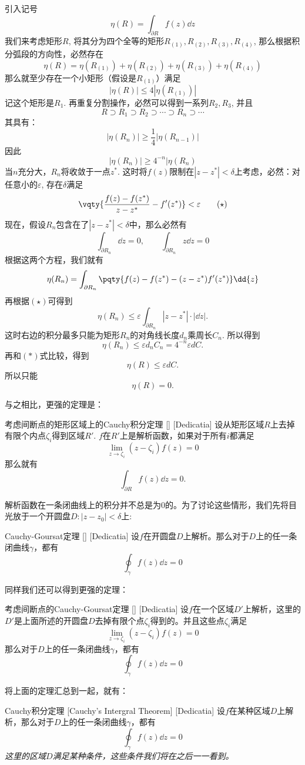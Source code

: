 \documentclass[UTF8]{ctexart}
\begin{document}
\begin{prf}
    引入记号
    \[\eta(R)=\int_{\partial R}f(z)\dd{z}\]
    我们来考虑矩形$R$, 将其分为四个全等的矩形$R_{(1)}, R_{(2)}, R_{(3)}, R_{(4)}$, 那么根据积分弧段的方向性，必然存在
    \[\eta(R)=\eta(R_{(1)})+\eta(R_{(2)})+\eta(R_{(3)})+\eta(R_{(4)})\]
    那么就至少存在一个小矩形（假设是$R_{(1)}$）满足
    \[|\eta(R)|\leqslant 4|\eta(R_{(1)})|\]
    记这个矩形是$R_1$. 再重复分割操作，必然可以得到一系列$R_2, R_3$, 并且
    \[R\supset R_1\supset R_2\supset\cdots\supset R_n\supset\cdots\]
    其具有：
    \[|\eta(R_n)|\geqslant \frac{1}{4}|\eta(R_{n-1})|\]
    因此
    \[|\eta(R_n)|\geqslant 4^{-n}|\eta(R_n)\tag{$\ast$}\]
    当$n$充分大，$R_n$将收敛于一点$z^*$. 这时将$f(z)$限制在$|z-z^*|<\delta $上考虑，必然：对任意小的$\varepsilon$, 存在$\delta$满足
    \[\vqty{\frac{f(z)-f(z^*)}{z-z^*}-f'(z^*)}<\varepsilon\tag{$\star$}\]
    现在，假设$R_n$包含在了$|z-z^*|<\delta$中，那么必然有
    \[\int_{\partial R_n}\dd{z}=0,\qquad\int_{\partial R_n}z\dd{z}=0\]
    根据这两个方程，我们就有
    \[\eta(R_n)=\int_{\partial R_n}\pqty{f(z)-f(z^*)-(z-z^*)f'(z^*)}\dd{z}\]
    再根据$(\star)$可得到
    \[\eta(R_n)\leqslant\varepsilon\int_{\partial R_n}|z-z^*|\cdot|\dd z|. \]
    这时右边的积分最多只能为矩形$R_n$的对角线长度$d_n$乘周长$C_n$. 所以得到
    \[\eta(R_n)\leqslant\varepsilon d_nC_n=4^{-n}\varepsilon dC.\]
    再和$(\ast)$式比较，得到
    \[\eta(R)\leqslant\varepsilon dC.\]
    所以只能
    \[\eta(R)=0.\]
\end{prf}
与之相比，更强的定理是：
\begin{thm}
    [UUID]
    {考虑间断点的矩形区域上的Cauchy积分定理}
    []
    [Dedicatia]
    设从矩形区域$R$上去掉有限个内点$\zeta_i$得到区域$R'$. $f$在$R'$上是解析函数，如果对于所有$i$都满足
    \[\lim_{z\to\zeta_i }(z-\zeta_i)f(z)=0\]
    那么就有
    \[\int_{\partial R}f(z)\dd{z}=0.\]
\end{thm}
解析函数在一条闭曲线上的积分并不总是为0的。为了讨论这些情形，我们先将目光放于一个开圆盘$D: |z-z_0|<\delta $上:
\begin{thm}
    [UUID]
    {Cauchy-Goursat定理}
    []
    [Dedicatia]
    设$f$在开圆盘$D$上解析。那么对于$D$上的任一条闭曲线$\gamma$，都有
    \[\oint_\gamma f(z)\dd{z}=0\]
\end{thm}
同样我们还可以得到更强的定理：
\begin{thm}
    [UUID]
    {考虑间断点的Cauchy-Goursat定理}
    []
    [Dedicatia]
    设$f$在一个区域$D'$上解析，这里的$D'$是上面所述的开圆盘$D$去掉有限个点$\zeta_i$得到的。并且这些点$\zeta_i$满足
    \[\lim_{z\to\zeta_i }(z-\zeta_i)f(z)=0\]
    那么对于$D$上的任一条闭曲线$\gamma$，都有
    \[\oint_\gamma f(z)\dd{z}=0\]
\end{thm}
将上面的定理汇总到一起，就有：
\begin{thm}
    [Cauchy]
    {Cauchy积分定理}
    [Cauchy's Intergral Theorem]
    [Dedicatia]
    设$f$在某种区域$D$上解析，那么对于$D$上的任一条闭曲线$\gamma$，都有
    \[\oint_\gamma f(z)\dd{z}=0\]
    \textit{这里的区域$D$满足某种条件，这些条件我们将在之后一一看到。}
\end{thm}
\end{document}
